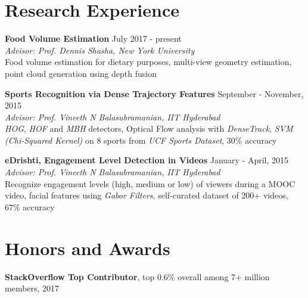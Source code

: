 \documentclass[margin,line]{res}
\begin{document}
\begin{resume}
\begin{comment}
  \vspace*{-3.5mm}

  {\bf La Montessori School}, Kullu, HP, India \hfill 2010 \\
	Matriculation,
    GPA: 9.8 / 10, ({\bf Top 2})

  \vspace*{-3.5mm}
  \end{comment}

\section{\sc Research Experience}
  {\bf Food Volume Estimation} \hfill July 2017 - present \\
    {\em Advisor: Prof. Dennis Shasha, New York University} \\
    Food volume estimation for dietary purposes, multi-view geometry estimation, point cloud generation using depth fusion

    \vspace*{-3.5mm}

  {\bf Sports Recognition via Dense Trajectory Features} \hfill September - November, 2015 \\
  	{\em Advisor: Prof. Vineeth N Balasubramanian, IIT Hyderabad} \\
    {\it HOG}, {\it HOF} and {\it MBH} detectors, Optical Flow analysis with {\it DenseTrack}, {\it SVM (Chi-Squared Kernel)} on 8 sports from {\it UCF Sports Dataset}, 30\% accuracy

  \vspace*{-3.5mm}

  {\bf eDrishti, Engagement Level Detection in Videos} \hfill January - April, 2015 \\
  	{\em Advisor: Prof. Vineeth N Balasubramanian, IIT Hyderabad} \\
  	Recognize engagement levels (high, medium or low) of viewers during a MOOC video, facial features using {\it Gabor Filters}, self-curated dataset of 200+ videos, 67\% accuracy

  \vspace*{-3.5mm}

\section{\sc Honors and Awards}

  {\bf StackOverflow Top Contributor}, top 0.6\% overall among 7+ million members, 2017

  \vspace*{-3.5mm}


\end{resume}
\end{document}
